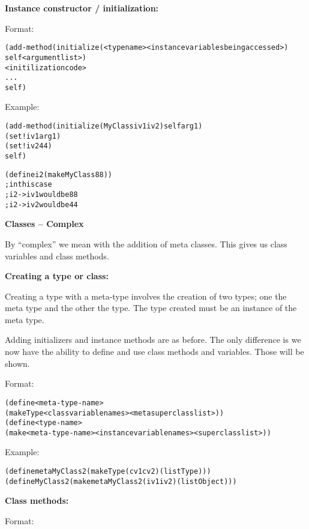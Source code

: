 \documentclass[12pt]{article}
\begin{document}
\textbf{Instance constructor / initialization:}

Format:

\begin{alltt}
   (add-method (initialize  (<type name>  <instance variables being accessed>)
                            self  <argument list>)
                     <initilization code>
                     ...
                     self)
\end{alltt}

Example:

\begin{alltt}
   (add-method (initialize (MyClass iv1 iv2) self arg1)
        (set! iv1 arg1)
        (set! iv2 44)
        self)

    (define i2 (make MyClass 88))
    ; in this case
    ; i2->iv1 would be 88
    ; i2->iv2 would be 44
\end{alltt}

\newpage

{\large \bfseries Classes -- Complex}

By ``complex'' we mean with the addition of meta classes.  This gives us class variables and class methods.

\textbf{Creating a type or class:}

Creating a type with a meta-type involves the creation of two types; one the meta type and the other the type.
The type created must be an instance of the meta type.

Adding initializers and instance methods are as before.  The only difference is we now have the ability
to define and use class methods and variables.  Those will be shown.

Format:

\begin{alltt}
   (define <meta-type-name>
           (make Type <class variable names> <meta superclass list>))
   (define <type-name>
           (make <meta-type-name>  <instance variable names>  <superclass list>))
\end{alltt}

Example:

\begin{alltt}
    (define metaMyClass2 (make Type (cv1 cv2) (list Type)))
    (define MyClass2 (make metaMyClass2 (iv1 iv2) (list Object)))
\end{alltt}

\textbf{Class methods:}

Format:
\end{document}
